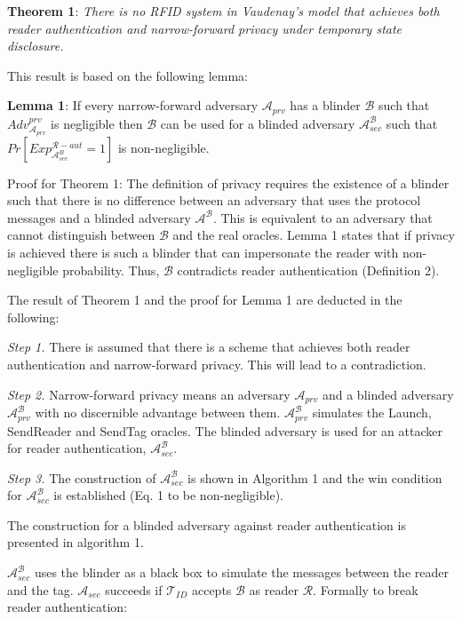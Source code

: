     \textbf{Theorem 1}: \textit{There is no RFID system in Vaudenay's model that achieves both reader authentication and narrow-forward privacy 
    under temporary state disclosure.}

    This result is based on the following lemma:

    \textbf{Lemma 1}: If every narrow-forward adversary $\mathcal{A}_{prv}$ has a blinder $\mathcal{B}$ such that $Adv_{\mathcal{A}_{prv}}^{prv}$ is negligible
    then $\mathcal{B}$ can be used for a blinded adversary $\mathcal{A}_{sec}^{\mathcal{B}}$ such that $Pr[Exp_{\mathcal{A}_{sec}^{B}}^{\mathcal{R}-aut} = 1]$ is
    non-negligible.

    Proof for Theorem 1: The definition of privacy requires the existence of a blinder such that there is no difference between an adversary that uses the 
    protocol messages and a blinded adversary $\mathcal{A}^{\mathcal{B}}$. This is equivalent to an adversary that cannot distinguish between $\mathcal{B}$
    and the real oracles. Lemma 1 states that if privacy is achieved there is such a blinder that can impersonate the reader with non-negligible probability.
    Thus, $\mathcal{B}$ contradicts reader authentication (Definition 2).

    The result of Theorem 1 and the proof for Lemma 1 are deducted in the following:

    \textit{Step 1.} There is assumed that there is a scheme that achieves both reader authentication and narrow-forward privacy. This will lead to a contradiction.
    
    \textit{Step 2.} Narrow-forward privacy means an adversary $\mathcal{A}_{prv}$ and a blinded adversary $\mathcal{A}_{prv}^{\mathcal{B}}$  with no discernible
    advantage between them. $\mathcal{A}_{prv}^{\mathcal{B}}$ simulates the Launch, SendReader and SendTag oracles.
    The blinded adversary is used for an attacker for reader authentication, $\mathcal{A}_{sec}^{\mathcal{B}}$.
    
    \textit{Step 3.} The construction of $\mathcal{A}_{sec}^{\mathcal{B}}$ is shown in Algorithm 1 and the win condition for $\mathcal{A}_{sec}^{\mathcal{B}}$
    is established (Eq. 1 to be non-negligible). 

    The construction for a blinded adversary against reader authentication is presented in algorithm 1.

    $\mathcal{A}_{sec}^{\mathcal{B}}$ uses the blinder as a black box to simulate the messages between the reader and the tag.
    $\mathcal{A}_{sec}$ succeeds if $\mathcal{T}_{ID}$ accepts $\mathcal{B}$ as reader $\mathcal{R}$. Formally to break reader authentication:

